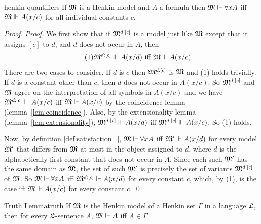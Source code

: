 \begin{lemma}{}{henkin-quantifiers}
  If $\mathfrak{M}$ is a Henkin model and $A$ a formula then
  $\mathfrak{M} \Vdash \forall x A$ iff
  $\mathfrak{M} \Vdash A(x/c)$ for all individual constants $c$.
\end{lemma}
\begin{proof}
  \emph{Proof.}
  We first show that
  if $\mathfrak{M}^{d:[c]}$ is a model just like $\mathfrak{M}$
  except that it assigns $[c]$ to $d$,
  and $d$ does not occur in $A$,
  then
  \begin{equation}\tag{1}
    \mathfrak{M}^{d:[c]} \Vdash A(x/d)\text{ iff }\mathfrak{M} \Vdash A(x/c).
  \end{equation}
  There are two cases to consider.
  If $d$ is $c$ then $\mathfrak{M}^{d:[c]}$ is $\mathfrak{M}$ and (1) holds trivially.
  If $d$ is a constant other than $c$, then $d$ does not occur in $A(x/c)$.
  So $\mathfrak{M}^{d:[c]}$ and $\mathfrak{M}$ agree on the interpretation of all symbols in $A(x/c)$
  and we have
  $\mathfrak{M}^{d:[c]} \Vdash A(x/c)$ iff $\mathfrak{M} \Vdash A(x/c)$
  by the coincidence lemma (lemma~\ref{lem:coincidence}).
  Also, by the extensionality lemma (lemma~\ref{lem:extensionality}),
  $\mathfrak{M}^{d:[c]} \Vdash A(x/d)$ iff $\mathfrak{M}^{d:[c]} \Vdash A(x/c)$.
  So (1) holds.

  Now, by definition \ref{def:satisfaction=},
  $\mathfrak{M} \Vdash \forall x A$ iff
  $\mathfrak{M}' \Vdash A(x/d)$ for every model $\mathfrak{M}'$
  that differs from $\mathfrak{M}$ at most in the object assigned to $d$,
  where $d$ is the alphabetically first constant that does not occur in $A$.
  Since each such $\mathfrak{M}'$ has the same domain as $\mathfrak{M}$,
  the set of such $\mathfrak{M}'$ is precisely the set of
  variants $\mathfrak{M}^{d:[c]}$ of $\mathfrak{M}$.
  So $\mathfrak{M} \Vdash \forall x A$ iff
  $\mathfrak{M}^{d:[c]} \Vdash A(x/d)$ for every constant $c$,
  which, by (1), is the case iff
  $\mathfrak{M} \Vdash A(x/c)$ for every constant $c$.
  \qed
\end{proof}

\begin{lemma}{Truth Lemma}{truth}
  If $\mathfrak{M}$ is the Henkin model of a Henkin set $\Gamma$ in a language $\mathfrak{L}$,
  then for every $\mathfrak{L}$-sentence $A$,
  $\mathfrak{M} \Vdash A$ iff $A \in \Gamma$.
\end{lemma}

